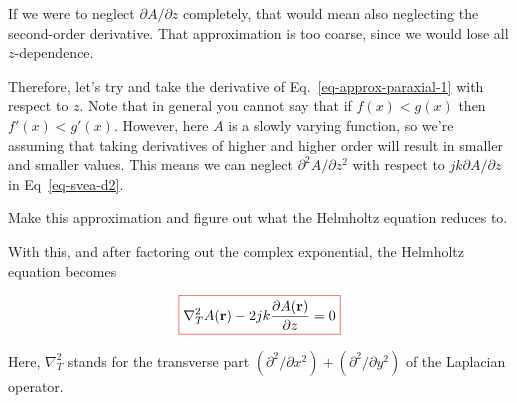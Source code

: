 If we were to neglect $\partial A / \partial z$ completely, that would mean also neglecting the second-order derivative. That approximation is too coarse, since we would lose all $z$-dependence.

Therefore, let's try and take the derivative of Eq.~\ref{eq-approx-paraxial-1} with respect to $z$. Note that in general you cannot say that if $f(x) < g(x)$ then $f'(x) < g'(x)$. However, here $A$ is a slowly varying function, so we're assuming that taking derivatives of higher and higher order will result in smaller and smaller values. This means we can neglect $\partial^2 A / \partial z^2$ with respect to $j k \partial A / \partial z$ in Eq~\ref{eq-svea-d2}. 

\begin{cue}
Make this approximation and figure out what the Helmholtz equation reduces to.
\end{cue}

With this, and after factoring out the complex exponential, the Helmholtz equation becomes

\begin{equation}
\fbox{$\displaystyle
\nabla_T^2 A({\mathbf r}) -2jk \frac{\partial A({\mathbf r})}{\partial z} = 0
$}
\label{eq-paraxial}
\end{equation} 

Here, $\nabla_T^2$ stands for the transverse part $(\partial^2 / \partial x^2) + (\partial^2 / \partial y^2)$ of the Laplacian operator.

